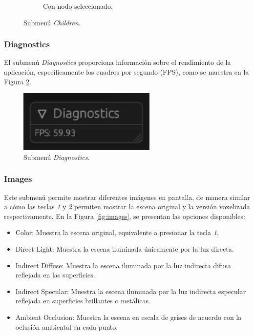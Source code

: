 \begin{figure}[h]
\begin{center}
\begin{subfigure}{.49\textwidth}
        \caption{Con nodo seleccionado.}
    \end{subfigure}
    \caption{Submenú \textit{Children}.}
    \label{fig:children}
    \end{center}
\end{figure}

\subsubsection{Diagnostics}

El submenú \textit{Diagnostics} proporciona información sobre el rendimiento de la aplicación, específicamente los cuadros por segundo (FPS), como se muestra en la Figura \ref{fig:diagnostics}.

\begin{figure}[h]
    \centering
    \includegraphics[width=.5\textwidth]{diagnostics.png}
    \caption{Submenú \textit{Diagnostics}.}
    \label{fig:diagnostics}
\end{figure}

\subsubsection{Images}

Este submenú permite mostrar diferentes imágenes en pantalla, de manera similar a cómo las teclas \textit{1} y \textit{2} permiten mostrar la escena original y la versión voxelizada respectivamente. En la Figura \ref{fig:images}, se presentan las opciones disponibles:

\begin{itemize}
    \item Color: Muestra la escena original, equivalente a presionar la tecla \textit{1}.
    \item Direct Light: Muestra la escena iluminada únicamente por la luz directa.
    \item Indirect Diffuse: Muestra la escena iluminada por la luz indirecta difusa reflejada en las superficies.
    \item Indirect Specular: Muestra la escena iluminada por la luz indirecta especular reflejada en superficies brillantes o metálicas.
    \item Ambient Occlusion: Muestra la escena en escala de grises de acuerdo con la oclusión ambiental en cada punto.
\end{itemize}

